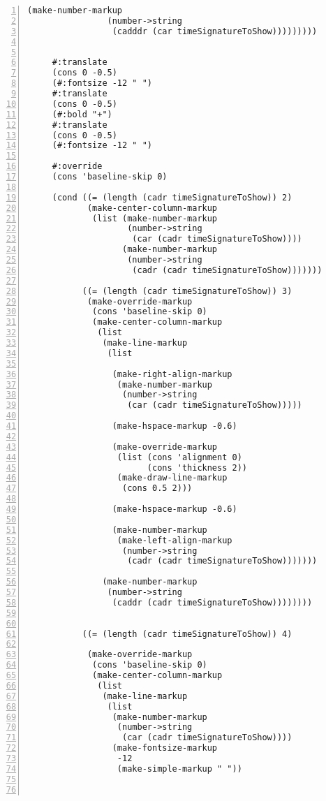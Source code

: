 \begin{Verbatim}[numbers=left,xleftmargin=5mm]
               (make-number-markup
                (number->string
                 (cadddr (car timeSignatureToShow)))))))))


     #:translate
     (cons 0 -0.5)
     (#:fontsize -12 " ")
     #:translate
     (cons 0 -0.5)
     (#:bold "+")
     #:translate
     (cons 0 -0.5)
     (#:fontsize -12 " ")

     #:override
     (cons 'baseline-skip 0)

     (cond ((= (length (cadr timeSignatureToShow)) 2)
            (make-center-column-markup
             (list (make-number-markup
                    (number->string
                     (car (cadr timeSignatureToShow))))
                   (make-number-markup
                    (number->string
                     (cadr (cadr timeSignatureToShow)))))))

           ((= (length (cadr timeSignatureToShow)) 3)
            (make-override-markup
             (cons 'baseline-skip 0)
             (make-center-column-markup
              (list
               (make-line-markup
                (list

                 (make-right-align-markup
                  (make-number-markup
                   (number->string
                    (car (cadr timeSignatureToShow)))))

                 (make-hspace-markup -0.6)

                 (make-override-markup
                  (list (cons 'alignment 0)
                        (cons 'thickness 2))
                  (make-draw-line-markup
                   (cons 0.5 2)))

                 (make-hspace-markup -0.6)

                 (make-number-markup
                  (make-left-align-markup
                   (number->string
                    (cadr (cadr timeSignatureToShow)))))))

               (make-number-markup
                (number->string
                 (caddr (cadr timeSignatureToShow))))))))


           ((= (length (cadr timeSignatureToShow)) 4)

            (make-override-markup
             (cons 'baseline-skip 0)
             (make-center-column-markup
              (list
               (make-line-markup
                (list
                 (make-number-markup
                  (number->string
                   (car (cadr timeSignatureToShow))))
                 (make-fontsize-markup
                  -12
                  (make-simple-markup " "))



\end{Verbatim}
